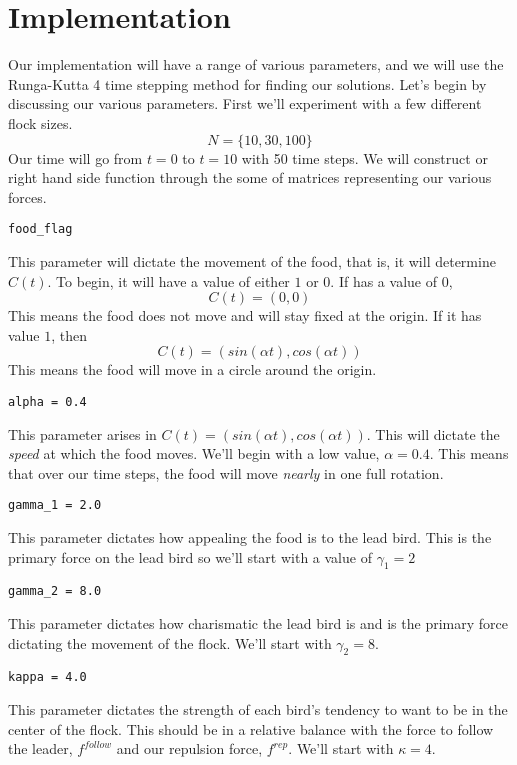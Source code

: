\documentclass[12pt]{article}
\begin{document}
\section{Implementation}

Our implementation will have a range of various parameters, and we will use the Runga-Kutta 4 time stepping method for finding our solutions. Let's begin by discussing our various parameters. First we'll experiment with a few different flock sizes.
$$N = \{10,30,100\}$$
Our time will go from $t = 0$ to $t = 10$ with 50 time steps. We will construct or right hand side function through the some of matrices representing our various forces.
\begin{verbatim}
food_flag
\end{verbatim}
This parameter will dictate the movement of the food, that is, it will determine $C(t)$. To begin, it will have a value of either $1$ or $0$. If has a value of $0$,
$$C(t) = (0,0)$$
This means the food does not move and will stay fixed at the origin. If it has value $1$, then
$$C(t) = (sin(\alpha t),cos(\alpha t))$$
This means the food will move in a circle around the origin.
\begin{verbatim}
alpha = 0.4
\end{verbatim}
This parameter arises in $C(t) = (sin(\alpha t),cos(\alpha t))$. This will dictate the \textit{speed} at which the food moves. We'll begin with a low value, $\alpha = 0.4$. This means that over our time steps, the food will move \textit{nearly} in one full rotation.
\begin{verbatim}
gamma_1 = 2.0
\end{verbatim}
This parameter dictates how appealing the food is to the lead bird. This is the primary force on the lead bird so we'll start with a value of $\gamma_1 = 2$

\begin{verbatim}
gamma_2 = 8.0
\end{verbatim}
This parameter dictates how charismatic the lead bird is and is the primary force dictating the movement of the flock. We'll start with $\gamma_2 = 8$.

\begin{verbatim}
kappa = 4.0
\end{verbatim}
This parameter dictates the strength of each bird's tendency to want to be in the center of the flock. This should be in a relative balance with the force to follow the leader, $f^{follow}$ and our repulsion force, $f^{rep}$. We'll start with $\kappa = 4$.
\end{document}
